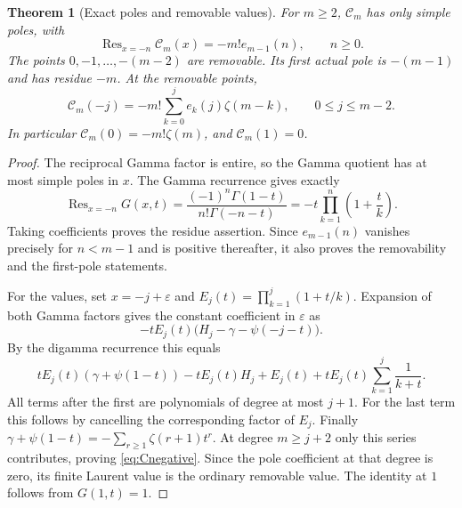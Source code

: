 \documentclass[11pt,a4paper]{article}
\numberwithin{equation}{section}
\newtheorem{theorem}{Theorem}[section]
\theoremstyle{definition}
\DeclareMathOperator{\Res}{Res}
\newcommand{\CM}{\mathcal C}
\begin{document}
\begin{theorem}[Exact poles and removable values]\label{thm:Cpoles}
For $m\ge2$, $\CM_m$ has only simple poles, with
\begin{equation}\label{eq:Cresidue}
 \Res_{x=-n}\CM_m(x)=-m!e_{m-1}(n),\qquad n\ge0.
\end{equation}
The points $0,-1,\ldots,-(m-2)$ are removable. Its first actual pole
is $-(m-1)$ and has residue $-m$. At the removable points,
\begin{equation}\label{eq:Cnegative}
 \boxed{\displaystyle
 \CM_m(-j)=-m!\sum_{k=0}^j e_k(j)\zeta(m-k),
       \qquad 0\le j\le m-2.}
\end{equation}
In particular $\CM_m(0)=-m!\zeta(m)$, and $\CM_m(1)=0$.
\end{theorem}
\begin{proof}
The reciprocal Gamma factor is entire, so the Gamma quotient has
at most simple poles in $x$. The Gamma recurrence gives exactly
\[
 \Res_{x=-n}G(x,t)
 =\frac{(-1)^n\Gamma(1-t)}{n!\Gamma(-n-t)}
 =-t\prod_{k=1}^n\left(1+\frac tk\right).
\]
Taking coefficients proves the residue assertion. Since $e_{m-1}(n)$
vanishes precisely for $n<m-1$ and is positive thereafter, it also
proves the removability and the first-pole statements.

For the values, set $x=-j+\varepsilon$ and
$E_j(t)=\prod_{k=1}^j(1+t/k)$. Expansion of both Gamma factors gives
the constant coefficient in $\varepsilon$ as
\[
 -tE_j(t)\bigl(H_j-\gamma-\psi(-j-t)\bigr).
\]
By the digamma recurrence this equals
\begin{equation}\label{eq:Cnegativeproof}
 tE_j(t)(\gamma+\psi(1-t))
 -tE_j(t)H_j+E_j(t)+tE_j(t)\sum_{k=1}^j\frac1{k+t}.
\end{equation}
All terms after the first are polynomials of degree at most $j+1$.
For the last term this follows by cancelling the corresponding factor
of $E_j$. Finally
$\gamma+\psi(1-t)=-\sum_{r\ge1}\zeta(r+1)t^r$.
At degree $m\ge j+2$ only this series contributes, proving
\eqref{eq:Cnegative}. Since the pole coefficient at that degree is
zero, its finite Laurent value is the ordinary removable value.
The identity at $1$ follows from $G(1,t)=1$.
\end{proof}
\end{document}
